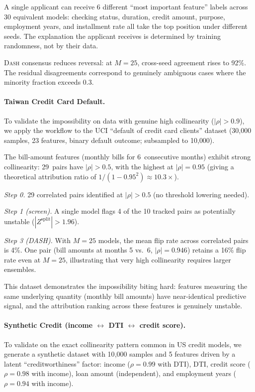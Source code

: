 \documentclass{article}
\newcommand{\DASH}{\textsc{Dash}}
\begin{document}
A single applicant can receive 6 different ``most important feature'' labels across 30 equivalent models: checking status, duration, credit amount, purpose, employment years, and installment rate all take the top position under different seeds. The explanation the applicant receives is determined by training randomness, not by their data.

\DASH{} consensus reduces reversal: at $M = 25$, cross-seed agreement rises to 92\%. The residual disagreements correspond to genuinely ambiguous cases where the minority fraction exceeds 0.3.

\paragraph{Taiwan Credit Card Default.}
To validate the impossibility on data with genuine high collinearity
($|\rho| > 0.9$), we apply the workflow to the UCI ``default of credit
card clients'' dataset (30{,}000 samples, 23 features, binary default
outcome; subsampled to 10{,}000).

The bill-amount features (monthly bills for 6~consecutive months)
exhibit strong collinearity: 29~pairs have $|\rho| > 0.5$, with the
highest at $|\rho| = 0.95$ (giving a theoretical attribution ratio of
$1/(1{-}0.95^2) \approx 10.3\times$).

\emph{Step 0.} 29 correlated pairs identified at $|\rho| > 0.5$
(no threshold lowering needed).

\emph{Step 1 (screen).} A single model flags 4 of the 10 tracked pairs
as potentially unstable ($|Z^{\text{split}}| > 1.96$).

\emph{Step 3 (DASH).} With $M = 25$ models, the mean flip rate
across correlated pairs is 4\%. One pair (bill amounts at months 5
vs.\ 6, $|\rho| = 0.946$) retains a 16\% flip rate even at $M = 25$,
illustrating that very high collinearity requires larger ensembles.

This dataset demonstrates the impossibility biting hard: features
measuring the same underlying quantity (monthly bill amounts) have
near-identical predictive signal, and the attribution ranking across
these features is genuinely unstable.

\paragraph{Synthetic Credit (income $\leftrightarrow$ DTI $\leftrightarrow$ credit score).}
To validate on the exact collinearity pattern common in US credit
models, we generate a synthetic dataset with 10{,}000 samples and
5 features driven by a latent ``creditworthiness'' factor:
income ($\rho = 0.99$ with DTI), DTI, credit score ($\rho = 0.98$
with income), loan amount (independent), and employment years
($\rho = 0.94$ with income).
\end{document}
